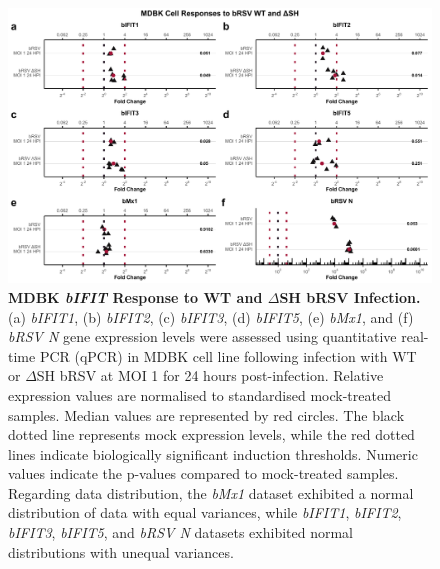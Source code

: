 \begin{figure}
    \centering
    \includegraphics[width=1\linewidth]{07. Chapter 2/Figs/02. Induction/05. mdbk_brsv_moi1_dsh.pdf}
    \caption[MDBK \textit{bIFIT} Response to WT and \(\Delta\)SH bRSV Infection.]{\textbf{MDBK \textit{bIFIT} Response to WT and \(\Delta\)SH bRSV Infection.} (a) \textit{bIFIT1}, (b) \textit{bIFIT2}, (c) \textit{bIFIT3}, (d) \textit{bIFIT5}, (e) \textit{bMx1}, and (f) \textit{bRSV N} gene expression levels were assessed using quantitative real-time PCR (qPCR) in MDBK cell line following infection with WT or \(\Delta\)SH bRSV at MOI 1 for 24 hours post-infection. Relative expression values are normalised to standardised mock-treated samples. Median values are represented by red circles. The black dotted line represents mock expression levels, while the red dotted lines indicate biologically significant induction thresholds. Numeric values indicate the p-values compared to mock-treated samples. Regarding data distribution, the \textit{bMx1} dataset exhibited a normal distribution of data with equal variances, while \textit{bIFIT1}, \textit{bIFIT2}, \textit{bIFIT3}, \textit{bIFIT5}, and \textit{bRSV N} datasets exhibited normal distributions with unequal variances.}
    \label{fig:MDBK responses to dSH}
\end{figure}

